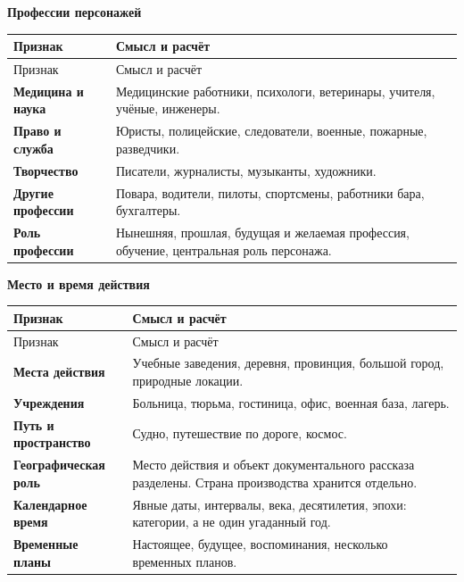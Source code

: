 \documentclass[11pt,a4paper]{article}
\begin{document}
\textbf{Профессии персонажей}


\begin{longtable}{>{\raggedright\arraybackslash}p{4.1cm}>{\raggedright\arraybackslash}p{10.8cm}}
\toprule
Признак & Смысл и расчёт \\
\midrule
\endfirsthead
\toprule
Признак & Смысл и расчёт \\
\midrule
\endhead
\textbf{Медицина и наука} & Медицинские работники, психологи, ветеринары, учителя, учёные, инженеры. \\[4pt]
\textbf{Право и служба} & Юристы, полицейские, следователи, военные, пожарные, разведчики. \\[4pt]
\textbf{Творчество} & Писатели, журналисты, музыканты, художники. \\[4pt]
\textbf{Другие профессии} & Повара, водители, пилоты, спортсмены, работники бара, бухгалтеры. \\[4pt]
\textbf{Роль профессии} & Нынешняя, прошлая, будущая и желаемая профессия, обучение, центральная роль персонажа. \\[4pt]
\bottomrule
\end{longtable}

\newpage

\textbf{Место и время действия}


\begin{longtable}{>{\raggedright\arraybackslash}p{4.1cm}>{\raggedright\arraybackslash}p{10.8cm}}
\toprule
Признак & Смысл и расчёт \\
\midrule
\endfirsthead
\toprule
Признак & Смысл и расчёт \\
\midrule
\endhead
\textbf{Места действия} & Учебные заведения, деревня, провинция, большой город, природные локации. \\[4pt]
\textbf{Учреждения} & Больница, тюрьма, гостиница, офис, военная база, лагерь. \\[4pt]
\textbf{Путь и пространство} & Судно, путешествие по дороге, космос. \\[4pt]
\textbf{Географическая роль} & Место действия и объект документального рассказа разделены. Страна производства хранится отдельно. \\[4pt]
\textbf{Календарное время} & Явные даты, интервалы, века, десятилетия, эпохи: категории, а не один угаданный год. \\[4pt]
\textbf{Временные планы} & Настоящее, будущее, воспоминания, несколько временных планов. \\[4pt]
\bottomrule
\end{longtable}
\end{document}
